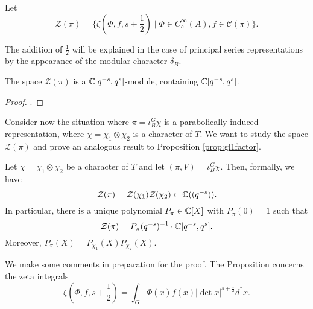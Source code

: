 \begin{notn}
    Let $$\mathcal Z(\pi) = \{\zeta(\Phi,f,s+\frac{1}{2}) \mid \Phi \in C_c^\infty(A), f \in \mathcal C(\pi)\}.$$
\end{notn}
\begin{rem}
    The addition of $\frac{1}{2}$ will be explained in the case of principal series representations by the appearance of the modular character $\delta_B$.
\end{rem}

\begin{lemma}
    The space $\mathcal Z(\pi)$ is a $\mathbb{C}[q^{-s},q^s]$-module, containing $\mathbb{C}[q^{-s},q^s]$.
\end{lemma}
\begin{proof}
    \cite[Lemma 24.4.2]{BH1}.
\end{proof}


Consider now the situation where $\pi = \iota_B^G \chi$ is a parabolically induced representation, where $\chi = \chi_1 \otimes \chi_2$ is a character of $T$. We want to study the space $\mathcal Z(\pi)$ and prove an analogous result to Proposition \ref{prop:gl1factor}.





\begin{prop}\label{prop:gl2factor}
    Let $\chi=\chi_1\otimes \chi_2$ be a character of $T$ and let $(\pi,V)=\iota_B^G \chi$. Then, formally, we have
    $$\mathcal Z(\pi) = \mathcal Z(\chi_1) \mathcal Z(\chi_2) \subset \mathbb{C}((q^{-s})).$$
    In particular, there is a unique polynomial $P_\pi \in \mathbb{C}[X]$ with $P_\pi(0)=1$ such that 
    $$\mathcal Z(\pi) = P_\pi(q^{-s})^{-1} \cdot \mathbb{C}[q^{-s},q^s].$$
    Moreover, $P_\pi(X) = P_{\chi_1}(X)P_{\chi_2}(X)$.
\end{prop}

We make some comments in preparation for the proof. The Proposition concerns the zeta integrals 
$$\zeta(\Phi,f,s+\frac{1}{2}) = \int_{G} \Phi(x)f(x)|\det x|^{s+\frac{1}{2}} d^*x.$$


